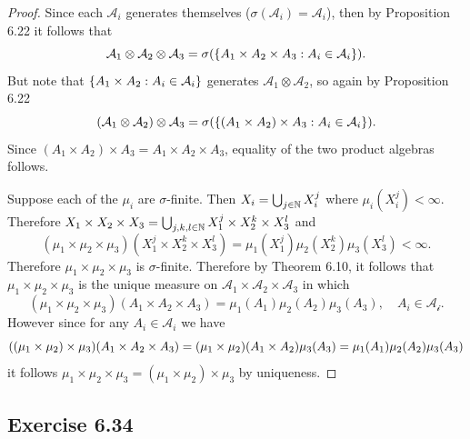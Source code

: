 \documentclass[hw_all.tex]{subfiles}
\begin{document}
\begin{proof}
    Since each $\mathcal{A}_i$ generates themselves ($\sigma(\mathcal{A}_i) = \mathcal{A}_i$), then by Proposition 6.22 it follows that
    \[
        \mathcal{A}_1 \otimes \mathcal{A}_2 \otimes \mathcal{A}_3 = \sigma\qty(\qty{A_1 \times A_2 \times A_3 : A_i \in \mathcal{A}_i})
    .\]
    But note that $\qty{A_1 \times A_2 : A_i \in \mathcal{A}_i}$ generates $\mathcal{A}_1 \otimes \mathcal{A}_2$, so again by Proposition 6.22
    \[
        (\mathcal{A}_1 \otimes \mathcal{A}_2) \otimes \mathcal{A}_3 = \sigma\qty(\qty{(A_1 \times A_2) \times A_3 : A_i \in \mathcal{A}_i})
    .\]
    Since $(A_1 \times A_2) \times A_3 = A_1 \times A_2 \times A_3$, equality of the two product algebras follows.

    Suppose each of the $\mu_i$ are $\sigma$-finite. Then $X_i = \bigcup_{j \in \mathbb{N}} X_{i}^j$ where $\mu_i(X_i^j) < \infty$. Therefore $X_1 \times X_2 \times X_3 = \bigcup_{j,k,l \in \mathbb{N}} X_1^j \times X_2^k \times X_3^l$ and
    \[
        (\mu_{1} \times \mu_2 \times \mu_3)(X_1^j \times X_2^k \times X_3^l) = \mu_1(X_1^j) \mu_2(X_2^k) \mu_3(X_3^l) < \infty
    .\]
    Therefore $\mu_1 \times \mu_2 \times \mu_3$ is $\sigma$-finite. Therefore by Theorem 6.10, it follows that $\mu_1 \times \mu_2 \times \mu_3$ is the unique measure on $\mathcal{A}_1 \times \mathcal{A}_2 \times \mathcal{A}_3$ in which
    \[
        (\mu_1 \times \mu_2 \times \mu_3)(A_1 \times A_2 \times A_3) = \mu_1(A_1) \mu_2(A_2) \mu_3(A_3), \quad A_i \in \mathcal{A_i}
    .\]
    However since for any $A_i \in \mathcal{A}_i$ we have
    \[
        \qty((\mu_1 \times \mu_2) \times \mu_3)(A_1 \times A_2 \times A_3) = \qty(\mu_1 \times \mu_2) (A_1 \times A_2) \mu_3(A_3) = \mu_1(A_1) \mu_2(A_2) \mu_3(A_3)
    \]
    it follows $\mu_1 \times \mu_2 \times \mu_3 = (\mu_1 \times \mu_2) \times \mu_3$ by uniqueness.
\end{proof}

\subsection{Exercise 6.34}
\end{document}
